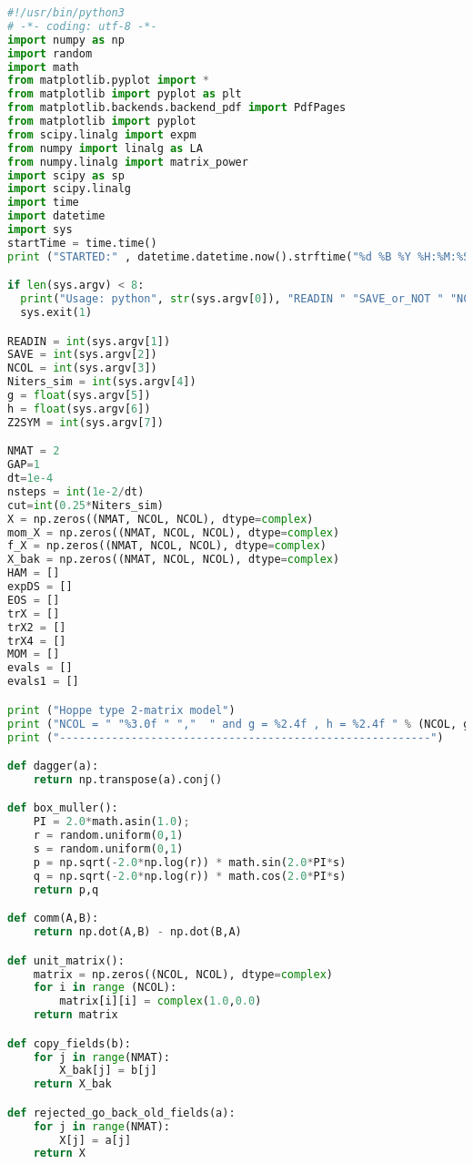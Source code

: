 \begin{footnotesize} 
\begin{lstlisting}[language=Python]
#!/usr/bin/python3
# -*- coding: utf-8 -*- 
import numpy as np
import random
import math
from matplotlib.pyplot import *
from matplotlib import pyplot as plt
from matplotlib.backends.backend_pdf import PdfPages
from matplotlib import pyplot
from scipy.linalg import expm
from numpy import linalg as LA
from numpy.linalg import matrix_power
import scipy as sp
import scipy.linalg
import time 
import datetime 
import sys
startTime = time.time()
print ("STARTED:" , datetime.datetime.now().strftime("%d %B %Y %H:%M:%S"))

if len(sys.argv) < 8:
  print("Usage: python", str(sys.argv[0]), "READIN " "SAVE_or_NOT " "NCOL " "ITERS " "g " "h " "Z2 symmetric?")
  sys.exit(1)

READIN = int(sys.argv[1])
SAVE = int(sys.argv[2])
NCOL = int(sys.argv[3])
Niters_sim = int(sys.argv[4])
g = float(sys.argv[5])
h = float(sys.argv[6])
Z2SYM = int(sys.argv[7])

NMAT = 2
GAP=1
dt=1e-4
nsteps = int(1e-2/dt)
cut=int(0.25*Niters_sim) 
X = np.zeros((NMAT, NCOL, NCOL), dtype=complex)
mom_X = np.zeros((NMAT, NCOL, NCOL), dtype=complex)
f_X = np.zeros((NMAT, NCOL, NCOL), dtype=complex)
X_bak = np.zeros((NMAT, NCOL, NCOL), dtype=complex)
HAM = []
expDS = [] 
EOS = [] 
trX = []
trX2 = [] 
trX4 = []
MOM = []
evals = [] 
evals1 = [] 

print ("Hoppe type 2-matrix model")
print ("NCOL = " "%3.0f " ","  " and g = %2.4f , h = %2.4f " % (NCOL, g, h))
print ("---------------------------------------------------------")

def dagger(a):
    return np.transpose(a).conj()

def box_muller():
    PI = 2.0*math.asin(1.0);
    r = random.uniform(0,1)
    s = random.uniform(0,1)
    p = np.sqrt(-2.0*np.log(r)) * math.sin(2.0*PI*s)
    q = np.sqrt(-2.0*np.log(r)) * math.cos(2.0*PI*s)
    return p,q

def comm(A,B):
    return np.dot(A,B) - np.dot(B,A)

def unit_matrix():
    matrix = np.zeros((NCOL, NCOL), dtype=complex)
    for i in range (NCOL):
        matrix[i][i] = complex(1.0,0.0)
    return matrix

def copy_fields(b):
    for j in range(NMAT):
        X_bak[j] = b[j]
    return X_bak

def rejected_go_back_old_fields(a):
    for j in range(NMAT):
        X[j] = a[j]
    return X


\end{lstlisting}
\end{footnotesize}
